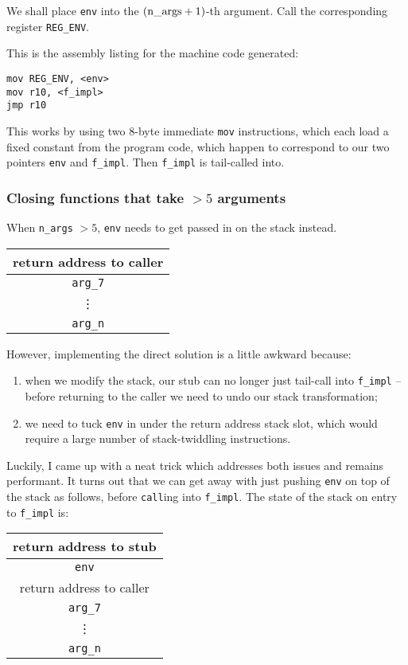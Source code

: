 \documentclass[12pt,a4paper,twoside,openright]{report}
\begin{document}
We shall place \lstinline!env! into the $(\text{\lstinline|n\_args|}+1)$-th
argument. Call the corresponding register \lstinline!REG_ENV!.

This is the assembly listing for the machine code generated:

\begin{lstlisting}
mov REG_ENV, <env>
mov r10, <f_impl>
jmp r10
\end{lstlisting}

This works by using two 8-byte immediate \lstinline!mov! instructions, which
each load a fixed constant from the program code, which happen to correspond to
our two pointers \lstinline!env! and \lstinline!f_impl!.
Then \lstinline!f_impl! is tail-called into.

\subsubsection{Closing functions that take $> 5$ arguments}

When \lstinline!n_args! $> 5$, \lstinline!env! needs to get passed in on the
stack instead.

\begin{tabular}{c}
  return address to caller
  \\ \hline\hline
  \lstinline!arg_7!
  \\ \hline
  \vdots
  \\ \hline
  \lstinline!arg_n!
\end{tabular}

However, implementing the direct solution is a little awkward because:
\begin{enumerate}
  \item when we modify the stack, our stub can no longer just tail-call
    into \lstinline!f_impl! -- before returning to the caller we need to undo
    our stack transformation;
  \item we need to tuck \lstinline!env! in under the return address
    stack slot, which would require a large number of stack-twiddling
    instructions.
\end{enumerate}

Luckily, I came up with a neat trick which addresses both issues and remains
performant. It turns out that we can get away with just pushing \lstinline!env!
on top of the stack as follows, before \lstinline!call!ing into
\lstinline!f_impl!. The state of the stack on entry to \lstinline!f_impl! is:

\begin{tabular}{c}
  return address to stub
  \\ \hline\hline
  \lstinline!env!
  \\ \hline
  return address to caller
  \\ \hline
  \lstinline!arg_7!
  \\ \hline
  \vdots
  \\ \hline
  \lstinline!arg_n!
\end{tabular}
\end{document}
